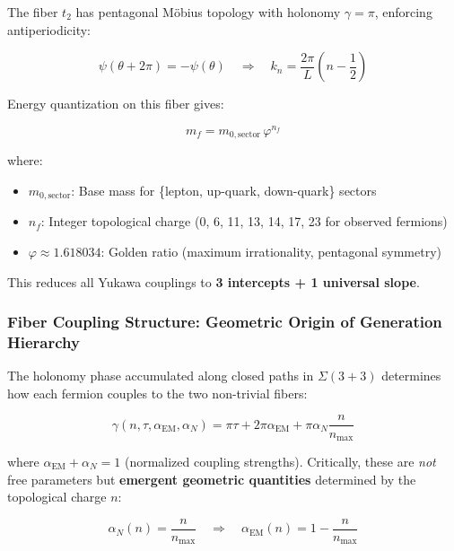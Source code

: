 \documentclass[12pt]{article}
\begin{document}
The fiber $t_2$ has pentagonal M\"obius topology with holonomy $\gamma = \pi$, enforcing antiperiodicity:

\begin{equation}
\psi(\theta + 2\pi) = -\psi(\theta) \quad \Rightarrow \quad k_n = \frac{2\pi}{L}\left(n - \frac{1}{2}\right)
\end{equation}

Energy quantization on this fiber gives:

\begin{equation}
\boxed{m_f = m_{0,\text{sector}} \, \varphi^{n_f}}
\end{equation}

where:
\begin{itemize}
\item \textbf{$m_{0,\text{sector}}$}: Base mass for \{lepton, up-quark, down-quark\} sectors
\item \textbf{$n_f$}: Integer topological charge (0, 6, 11, 13, 14, 17, 23 for observed fermions)
\item \textbf{$\varphi \approx 1.618034$}: Golden ratio (maximum irrationality, pentagonal symmetry)
\end{itemize}

This reduces all Yukawa couplings to \textbf{3 intercepts + 1 universal slope}.

\subsubsection{Fiber Coupling Structure: Geometric Origin of Generation Hierarchy}

The holonomy phase accumulated along closed paths in $\Sigma(3+3)$ determines how each fermion couples to the two non-trivial fibers:

\begin{equation}
\gamma(n, \tau, \alpha_{\text{EM}}, \alpha_N) = \pi\tau + 2\pi\alpha_{\text{EM}} + \pi\alpha_N\frac{n}{n_{\max}}
\end{equation}

where $\alpha_{\text{EM}} + \alpha_N = 1$ (normalized coupling strengths). Critically, these are \textit{not} free parameters but \textbf{emergent geometric quantities} determined by the topological charge $n$:

\begin{equation}
\alpha_N(n) = \frac{n}{n_{\max}} \quad \Rightarrow \quad \alpha_{\text{EM}}(n) = 1 - \frac{n}{n_{\max}}
\end{equation}
\end{document}
